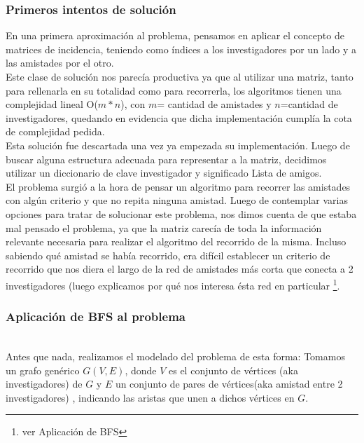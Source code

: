 \subsubsection{Primeros intentos de solución}
\indent En una primera aproximación al problema, pensamos en aplicar el
concepto de matrices de incidencia,
teniendo como índices a los investigadores por un lado y a las amistades por el
otro.\\
\indent Este clase de solución nos parecía productiva ya que al utilizar una
matriz, tanto para rellenarla en su totalidad como para recorrerla, los
algoritmos tienen una complejidad lineal O($m*n$), con $m$= cantidad de
amistades y $n$=cantidad de investigadores, quedando en evidencia que dicha
implementación cumplía la cota de complejidad pedida. \\
\indent Esta solución fue descartada una vez ya empezada su implementación.
Luego de buscar alguna estructura adecuada para representar a la matriz,
decidimos utilizar un diccionario de clave investigador y significado Lista de
amigos.\\
\indent El problema surgió a la hora de pensar un algoritmo para recorrer las
amistades con algún criterio y que no repita ninguna amistad. Luego de
contemplar varias opciones para tratar de solucionar este problema, nos dimos
cuenta de que estaba mal pensado el problema, ya que la matriz carecía de toda la
información relevante necesaria para realizar el algoritmo del recorrido de la
misma. Incluso sabiendo qué amistad se había recorrido, era difícil establecer
un criterio de recorrido que nos diera el largo de la red de amistades más corta
que conecta a 2 investigadores (luego explicamos por qué nos interesa ésta red
en particular \footnote{ver Aplicación de BFS}.


\subsubsection{Aplicación de BFS al problema}
\indent {}\\

\indent Antes que nada, realizamos el modelado del problema de esta forma:
Tomamos un grafo genérico $G(V,E)$, donde $V$ es el conjunto de vértices (aka
investigadores) de $G$ y $E$ un conjunto de pares de vértices(aka amistad entre
2 investigadores) , indicando las aristas que unen a dichos vértices en $G$.\\

